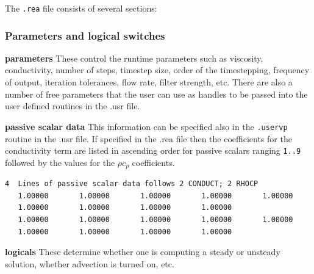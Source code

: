
The {\tt .rea} file consists of several sections:
\subsubsection*{ Parameters and logical switches}
\begin{description}
\item{\bf parameters} These control the runtime parameters such as viscosity,
    conductivity, number of steps, timestep size, order of the timestepping,
    frequency of output, iteration tolerances, flow rate, filter strength,
    etc.   There are also a number of free parameters that the user can
    use as handles to be passed into the user defined routines in the .usr file.
\item{\bf passive scalar data} This information can be specified also in the \texttt{.uservp} routine in the .usr file. If specified in the .rea file then the coefficients for the conductivity term are listed in ascending order for passive scalars ranging \texttt{1..9} followed by the values for the $\rho c_p$ coefficients.
\begin{verbatim}
4  Lines of passive scalar data follows 2 CONDUCT; 2 RHOCP
   1.00000       1.00000       1.00000       1.00000       1.00000
   1.00000       1.00000       1.00000       1.00000
   1.00000       1.00000       1.00000       1.00000       1.00000
   1.00000       1.00000       1.00000       1.00000
\end{verbatim}
\item{\bf logicals} These determine whether one is computing a steady or unsteady
  solution, whether advection is turned on, etc.
\end{description}

